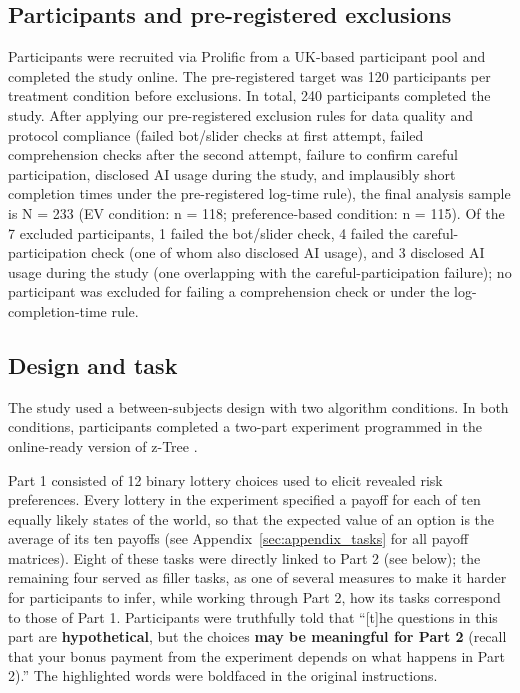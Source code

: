 \documentclass[a4paper, 12pt, fleqn]{article}
\theoremstyle{hypstyle}
\begin{document}
\subsection{Participants and pre-registered exclusions}
Participants were recruited via Prolific from a UK-based participant pool and completed the study online. The pre-registered target was 120 participants per treatment condition before exclusions. In total, 240 participants completed the study. After applying our pre-registered exclusion rules for data quality and protocol compliance (failed bot/slider checks at first attempt, failed comprehension checks after the second attempt, failure to confirm careful participation, disclosed AI usage during the study, and implausibly short completion times under the pre-registered log-time rule), the final analysis sample is N = 233 (EV condition: n = 118; preference-based condition: n = 115). Of the 7 excluded participants, 1 failed the bot/slider check, 4 failed the careful-participation check (one of whom also disclosed AI usage), and 3 disclosed AI usage during the study (one overlapping with the careful-participation failure); no participant was excluded for failing a comprehension check or under the log-completion-time rule.

\subsection{Design and task}
The study used a between-subjects design with two algorithm conditions. In both conditions, participants completed a two-part experiment programmed in the online-ready version of z-Tree \citep[version 6.0.0 beta 69,][]{Fischbacher07}.

Part 1 consisted of 12 binary lottery choices used to elicit revealed risk preferences. Every lottery in the experiment specified a payoff for each of ten equally likely states of the world, so that the expected value of an option is the average of its ten payoffs (see Appendix~\ref{sec:appendix_tasks} for all payoff matrices). Eight of these tasks were directly linked to Part 2 (see below); the remaining four served as filler tasks, as one of several measures to make it harder for participants to infer, while working through Part 2, how its tasks correspond to those of Part 1. Participants were truthfully told that ``[t]he questions in this part are \textbf{hypothetical}, but the choices \textbf{may be meaningful for Part 2} (recall that your bonus payment from the experiment depends on what happens in Part 2).'' The highlighted words were boldfaced in the original instructions. 
\end{document}
